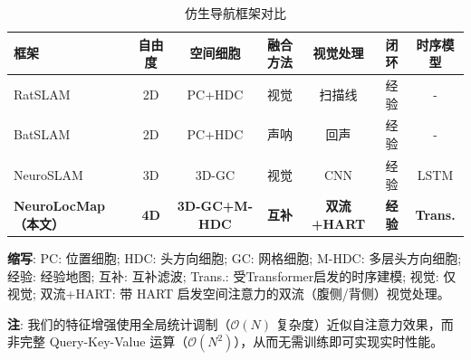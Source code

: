 \begin{table}[!t]
       \centering
       \footnotesize
       \caption{仿生导航框架对比}
       \label{tab:comparison_bioslam}
       \setlength{\tabcolsep}{2.2pt}
       \begin{threeparttable}
              \scriptsize\begin{tabular}{lcccccc}
                     \toprule
                     框架                         & 自由度         & 空间细胞        & 融合方法  & 视觉处理     & 闭环  & 时序模型     \\
                     \midrule
                     RatSLAM~\cite{milford2008mapping} & 2D          & PC+HDC               & 视觉           & 扫描线           & 经验      & -               \\
                     BatSLAM~\cite{steckel2013batslam} & 2D          & PC+HDC               & 声呐          & 回声             & 经验      & -               \\
                     NeuroSLAM~\cite{Yu2019}                         & 3D          & 3D-GC                & 视觉           & CNN              & 经验      & LSTM            \\
                     \midrule
                     \textbf{NeuroLocMap（本文）}       & \textbf{4D} & \textbf{3D-GC+M-HDC} & \textbf{互补} & \textbf{双流+HART} & \textbf{经验} & \textbf{Trans.} \\
                     \bottomrule
              \end{tabular}
              \begin{tablenotes}
                     \scriptsize
                     \item \textbf{缩写}: PC: 位置细胞; HDC: 头方向细胞; GC: 网格细胞; M-HDC: 多层头方向细胞; 经验: 经验地图; 互补: 互补滤波; Trans.: 受Transformer启发的时序建模; 视觉: 仅视觉; 双流+HART: 带 HART 启发空间注意力的双流（腹侧/背侧）视觉处理。
                     \item \textbf{注}: 我们的特征增强使用全局统计调制（$\mathcal{O}(N)$ 复杂度）近似自注意力效果，而非完整 Query-Key-Value 运算（$\mathcal{O}(N^2)$），从而无需训练即可实现实时性能。
              \end{tablenotes}
       \end{threeparttable}
\end{table}
